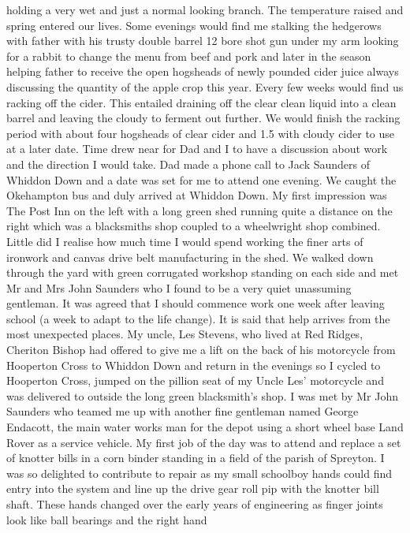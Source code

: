 holding a very wet and just a normal looking branch. The temperature raised and
spring entered our lives. Some evenings would find me stalking the hedgerows
with father with his trusty double barrel 12 bore shot gun under my arm looking
for a rabbit to change the menu from beef and pork and later in the season
helping father to receive the open hogsheads of newly pounded cider juice
always discussing the quantity of the apple crop this year. Every few weeks
would find us racking off the cider. This entailed draining off the clear clean
liquid into a clean barrel and leaving the cloudy to ferment out further. We
would finish the racking period with about four hogsheads of clear cider and
1.5 with cloudy cider to use at a later date. Time drew near for Dad and I to
have a discussion about work and the direction I would take. Dad made a phone
call to Jack Saunders of Whiddon Down and a date was set for me to attend one
evening. We caught the Okehampton bus and duly arrived at Whiddon Down. My
first impression was The Post Inn on the left with a long green shed running
quite a distance on the right which was a blacksmiths shop coupled to a
wheelwright shop combined. Little did I realise how much time I would spend
working the finer arts of ironwork and canvas drive belt manufacturing in the
shed. We walked down through the yard with green corrugated workshop standing
on each side and met Mr and Mrs John Saunders who I found to be a very quiet
unassuming gentleman. It was agreed that I should commence work one week after
leaving school (a week to adapt to the life change). It is said that help
arrives from the most unexpected places. My uncle, Les Stevens, who lived at
Red Ridges, Cheriton Bishop had offered to give me a lift on the back of his
motorcycle from Hooperton Cross to Whiddon Down and return in the evenings so I
cycled to Hooperton Cross, jumped on the pillion seat of my Uncle Les'
motorcycle and was delivered to outside the long green blacksmith's shop. I was
met by Mr John Saunders who teamed me up with another fine gentleman named
George Endacott, the main water works man for the depot using a short wheel
base Land Rover as a service vehicle. My first job of the day was to attend and
replace a set of knotter bills in a corn binder standing in a field of the
parish of Spreyton. I was so delighted to contribute to repair as my small
schoolboy hands could find entry into the system and line up the drive gear
roll pip with the knotter bill shaft. These hands changed over the early years
of engineering as finger joints look like ball bearings and the right hand
